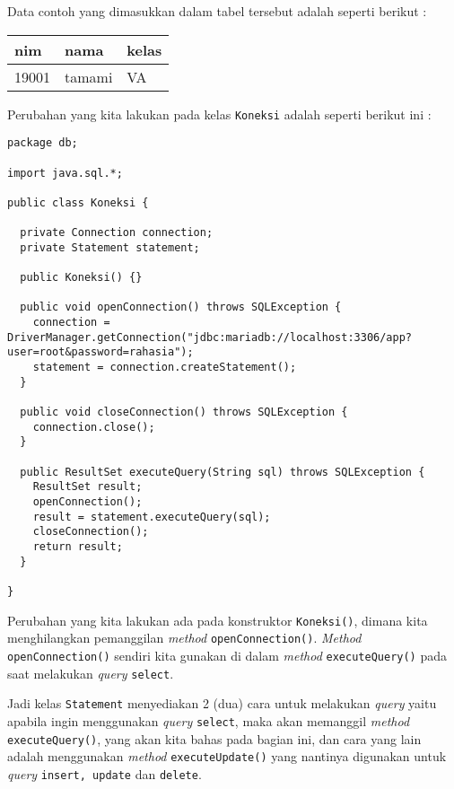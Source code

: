 Data contoh yang dimasukkan dalam tabel tersebut adalah seperti berikut :

\begin{table}[H]
\begin{center}
\begin{tabular}{| l | l | l |}
\hline
\textbf{nim} & \textbf{nama} & \textbf{kelas} \\
\hline \hline
19001 & tamami & VA \\
\hline
\end{tabular}
\end{center}
\end{table}

Perubahan yang kita lakukan pada kelas \texttt{Koneksi} adalah seperti berikut ini :

\begin{lstlisting}
package db;

import java.sql.*;

public class Koneksi {
  
  private Connection connection;
  private Statement statement;
  
  public Koneksi() {}  
  
  public void openConnection() throws SQLException {
    connection = DriverManager.getConnection("jdbc:mariadb://localhost:3306/app?user=root&password=rahasia");
    statement = connection.createStatement();
  }
  
  public void closeConnection() throws SQLException {
    connection.close();
  }
  
  public ResultSet executeQuery(String sql) throws SQLException {
    ResultSet result;
    openConnection();
    result = statement.executeQuery(sql);
    closeConnection();
    return result;
  }
  
}
\end{lstlisting}

Perubahan yang kita lakukan ada pada konstruktor \texttt{Koneksi()}, dimana kita menghilangkan pemanggilan \textit{method} \texttt{openConnection()}. \textit{Method} \texttt{openConnection()} sendiri kita gunakan di dalam \textit{method} \texttt{executeQuery()} pada saat melakukan \textit{query} \texttt{select}. 

Jadi kelas \texttt{Statement} menyediakan 2 (dua) cara untuk melakukan \textit{query} yaitu apabila ingin menggunakan \textit{query} \texttt{select}, maka akan memanggil \textit{method} \texttt{executeQuery()}, yang akan kita bahas pada bagian ini, dan cara yang lain adalah menggunakan \textit{method} \texttt{executeUpdate()} yang nantinya digunakan untuk \textit{query} \texttt{insert, update} dan \texttt{delete}.

